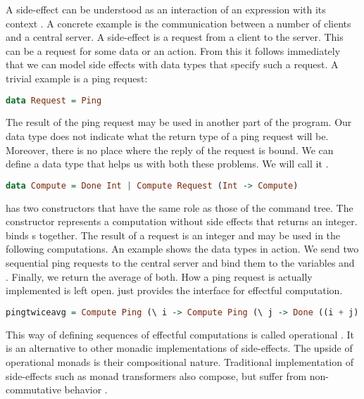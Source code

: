 A side-effect can be understood as an interaction of an expression with its context \autocite{DBLP:conf/tacs/CartwrightF94}. A concrete example is the communication between a number of clients and a central server. A side-effect is a request from a client to the server. This can be a request for some data or an action. From this it follows immediately that we can model side effects with data types that specify such a request. A trivial example is a ping request:

\begin{lstlisting}[language=Haskell]
data Request = Ping
\end{lstlisting}

The result of the ping request may be used in another part of the program. Our  data type does not indicate what the return type of a ping request will be. Moreover, there is no place where the reply of the request is bound. We can define a data type that helps us with both these problems. We will call it .

\begin{lstlisting}[language=Haskell]
data Compute = Done Int | Compute Request (Int -> Compute)
\end{lstlisting}

 has two constructors that have the same role as those of the command tree. The  constructor represents a computation without side effects that returns an integer.  binds s together. The result of a request is an integer and may be used in the following computations. An example shows the data types in action. We send two sequential ping requests to the central server and bind them to the variables  and . Finally, we return the average of both. How a ping request is actually implemented is left open.  just provides the interface for effectful computation.

\begin{lstlisting}[language=Haskell]
pingtwiceavg = Compute Ping (\ i -> Compute Ping (\ j -> Done ((i + j) `div` 2)))
\end{lstlisting}

This way of defining sequences of effectful computations is called operational \autocite{operationalmonad}. It is an alternative to other monadic implementations of side-effects. The upside of operational monads is their compositional nature. Traditional implementation of side-effects such as monad transformers \autocite{DBLP:conf/popl/LiangHJ95} also compose, but suffer from non-commutative behavior \autocite{DBLP:conf/ifl/DayH13}.

